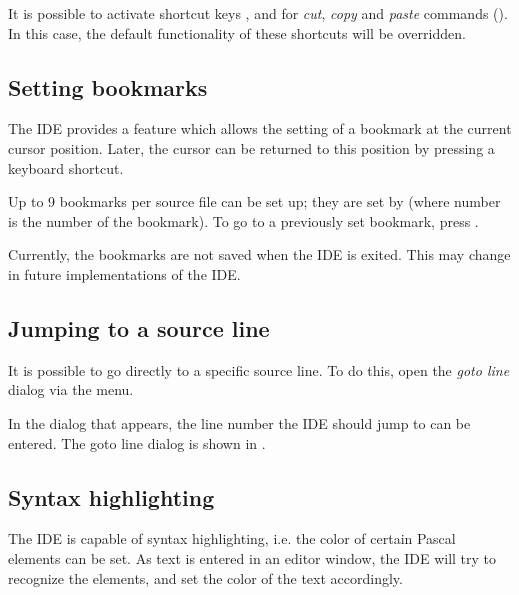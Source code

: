 It is possible to activate shortcut keys ,  and
 for {\em cut}, {\em copy} and {\em paste} commands
(). In this case, the default functionality of these shortcuts
will be overridden.
%
%
\subsection{Setting bookmarks}
\label{se:bookmarks}
The IDE provides a feature which allows the setting of a bookmark at the current
cursor position. Later, the cursor can be returned to this position
by pressing a keyboard shortcut.

Up to 9 bookmarks per source file can be set up; they are set by
 (where number is the number of the bookmark).
To go to a previously set bookmark, press .

\begin{remark}
Currently, the bookmarks are not saved when the IDE is exited. 
This may change in future implementations of the IDE.
\end{remark}

%
%
\subsection{Jumping to a source line}
It is possible to go directly to a specific source line. To do this, open
the {\em goto line} dialog via the  menu.

In the dialog that appears, the line number the IDE should jump to can be
entered. The goto line dialog is shown in .


%
%
\subsection{Syntax highlighting}
\label{se:syntaxhighlighting}
The IDE is capable of syntax highlighting, i.e. the color of certain
Pascal elements can be set. As text is entered in an editor window,
the IDE will try to recognize the elements, and set the color of the
text accordingly.


